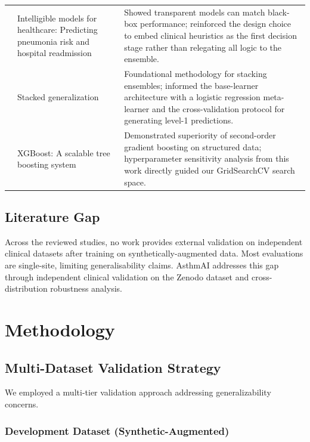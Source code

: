 \documentclass[11pt,a4paper]{article}
\begin{document}
\begin{table}[H]
\begin{tabularx}{\textwidth}{c p{4.5cm} X}
\addlinespace
6 & Intelligible models for healthcare: Predicting pneumonia risk and hospital readmission \cite{caruana2015} &
Showed transparent models can match black-box performance; reinforced the design choice to embed clinical heuristics as the first decision stage rather than relegating all logic to the ensemble. \\
\addlinespace
7 & Stacked generalization \cite{wolpert1992} &
Foundational methodology for stacking ensembles; informed the base-learner architecture with a logistic regression meta-learner and the cross-validation protocol for generating level-1 predictions. \\
\addlinespace
8 & XGBoost: A scalable tree boosting system \cite{chen2016} &
Demonstrated superiority of second-order gradient boosting on structured data; hyperparameter sensitivity analysis from this work directly guided our GridSearchCV search space. \\
\bottomrule
\end{tabularx}
\end{table}

\subsection{Literature Gap}

Across the reviewed studies, no work provides external validation on independent clinical
datasets after training on synthetically-augmented data. Most evaluations are single-site,
limiting generalisability claims. AsthmAI addresses this gap through independent clinical
validation on the Zenodo dataset and cross-distribution robustness analysis.

\section{Methodology}

\subsection{Multi-Dataset Validation Strategy}

We employed a multi-tier validation approach addressing generalizability concerns.

\subsubsection{Development Dataset (Synthetic-Augmented)}
\end{document}
